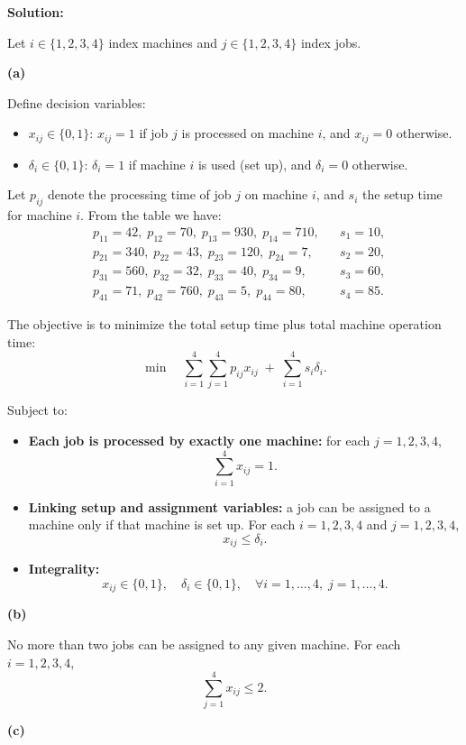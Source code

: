 \documentclass{article}
\begin{document}
\begin{enumerate}
\textbf{Solution:}

Let $i \in \{1,2,3,4\}$ index machines and $j \in \{1,2,3,4\}$ index jobs.

\textbf{(a)}

Define decision variables:
\begin{itemize}
    \item $x_{ij} \in \{0,1\}$: $x_{ij} = 1$ if job $j$ is processed on machine $i$, and $x_{ij} = 0$ otherwise.
    \item $\delta_i \in \{0,1\}$: $\delta_i = 1$ if machine $i$ is used (set up), and $\delta_i = 0$ otherwise.
\end{itemize}

Let $p_{ij}$ denote the processing time of job $j$ on machine $i$, and $s_i$ the setup time for machine $i$. From the table we have:
\[
\begin{aligned}
&p_{11}=42,\; p_{12}=70,\; p_{13}=930,\; p_{14}=710, && s_1=10,\\
&p_{21}=340,\; p_{22}=43,\; p_{23}=120,\; p_{24}=7, && s_2=20,\\
&p_{31}=560,\; p_{32}=32,\; p_{33}=40,\; p_{34}=9, && s_3=60,\\
&p_{41}=71,\; p_{42}=760,\; p_{43}=5,\; p_{44}=80, && s_4=85.
\end{aligned}
\]

The objective is to minimize the total setup time plus total machine operation time:
\[
\min \quad \sum_{i=1}^4 \sum_{j=1}^4 p_{ij} x_{ij} \;+\; \sum_{i=1}^4 s_i \delta_i.
\]

Subject to:
\begin{itemize}
    \item \textbf{Each job is processed by exactly one machine:} for each $j=1,2,3,4$,
    \[
        \sum_{i=1}^4 x_{ij} = 1.
    \]
    \item \textbf{Linking setup and assignment variables:} a job can be assigned to a machine only if that machine is set up. For each $i=1,2,3,4$ and $j=1,2,3,4$,
    \[
        x_{ij} \le \delta_i.
    \]
    \item \textbf{Integrality:}
    \[
        x_{ij} \in \{0,1\}, \quad \delta_i \in \{0,1\}, \quad \forall i=1,\dots,4,\; j=1,\dots,4.
    \]
\end{itemize}

\textbf{(b)}

No more than two jobs can be assigned to any given machine. For each $i=1,2,3,4$,
\[
    \sum_{j=1}^4 x_{ij} \le 2.
\]

\textbf{(c)}


\end{enumerate}
\end{document}
